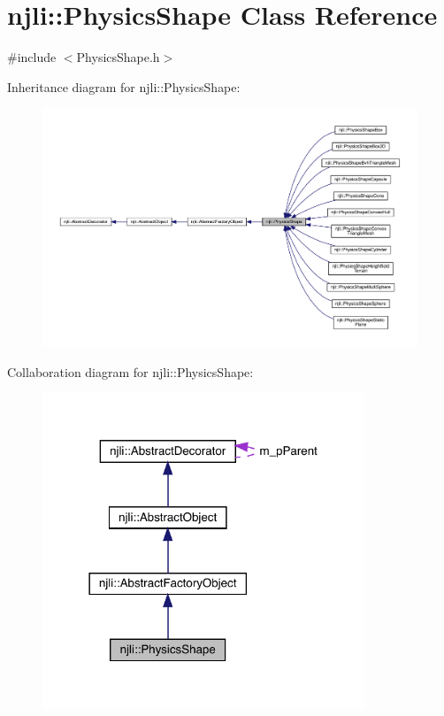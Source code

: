 \hypertarget{classnjli_1_1_physics_shape}{}\section{njli\+:\+:Physics\+Shape Class Reference}
\label{classnjli_1_1_physics_shape}


{\ttfamily \#include $<$Physics\+Shape.\+h$>$}



Inheritance diagram for njli\+:\+:Physics\+Shape\+:\nopagebreak
\begin{figure}[H]
\begin{center}
\leavevmode
\includegraphics[width=350pt]{classnjli_1_1_physics_shape__inherit__graph}
\end{center}
\end{figure}


Collaboration diagram for njli\+:\+:Physics\+Shape\+:\nopagebreak
\begin{figure}[H]
\begin{center}
\leavevmode
\includegraphics[width=273pt]{classnjli_1_1_physics_shape__coll__graph}
\end{center}
\end{figure}
